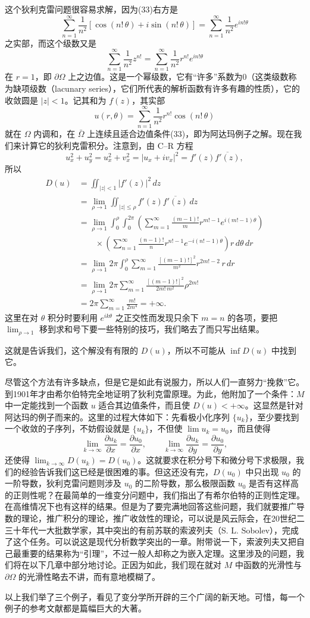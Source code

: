 这个狄利克雷问题很容易求解，因为(33)右方是
\[
 \sum_{n=1}^{\infty}\frac1{n^2}
 [\cos(n!\,\theta)+i\sin(n!\,\theta)]
 =\sum_{n=1}^{\infty}\frac1{n^2}e^{in!\theta}
\]
之实部，而这个级数又是
\[
 \sum_{n=1}^{\infty}\frac1{n^2}z^{n!}
 =\sum_{n=1}^{\infty}\frac1{n^2}r^{n!}e^{in!\theta}
\]
在 $r=1$，即 $\partial\Omega$ 上之边值。这是一个幂级数，它有“许多”系数为0（这类级数称为缺项级数（lacunary series），它们所代表的解析函数有许多有趣的性质），它的收敛圆是 $|z|<1$。记其和为 $f(z)$，其实部
\[
 u(r,\theta)=\sum_{n=1}^{\infty}\frac1{n^2}r^{n!}\cos(n!\,\theta)
\]
就在 $\Omega$ 内调和，在 $\bar\Omega$ 上连续且适合边值条件(33)，即为阿达玛例子之解。现在我们来计算它的狄利克雷积分。注意到，由 C--R 方程
\[
 u_x^2+u_y^2=u_x^2+v_x^2=|u_x+iv_x|^2=f'(z)\overline{f'(z)},
\]
所以
\begin{align*}
 D(u)
 &=\iint_{|z|<1}|f'(z)|^2\,dz\\
 &=\lim_{\rho\to1}\iint_{|z|\le\rho}f'(z)\overline{f'(z)}\,dz\\
 &=\lim_{\rho\to1}\int_0^\rho\int_0^{2\pi}
 \left(\sum_{m=1}^{\infty}\frac{(m-1)!}{m}r^{m!-1}e^{i(m!-1)\theta}\right)\\[-.25em]
 &\qquad\times
 \left(\sum_{n=1}^{\infty}\frac{(n-1)!}{n}r^{n!-1}e^{-i(n!-1)\theta}\right)
 r\,d\theta\,dr\\
 &=\lim_{\rho\to1}2\pi\int_0^\rho
 \sum_{m=1}^{\infty}\frac{[(m-1)!]^2}{m^2}r^{2m!-2}\,r\,dr\\
 &=\lim_{\rho\to1}2\pi\sum_{m=1}^{\infty}
 \frac{[(m-1)!]^2}{2m!\,m^2}\rho^{2m!}\\
 &=2\pi\sum_{m=1}^{\infty}\frac{m!}{2m^4}=+\infty.
\end{align*}
这里在对 $\theta$ 积分时要利用 $e^{ik\theta}$ 之正交性而发现只余下 $m=n$ 的各项，要把 $\lim_{\rho\to1}$ 移到求和号下要一些特别的技巧，我们略去了而只写出结果。

这就是告诉我们，这个解没有有限的 $D(u)$，所以不可能从 $\inf D(u)$ 中找到它。

尽管这个方法有许多缺点，但是它是如此有说服力，所以人们一直努力“挽救”它。到1901年才由希尔伯特完全地证明了狄利克雷原理。为此，他附加了一个条件：$M$ 中一定能找到一个函数 $u$ 适合其边值条件，而且使 $D(u)<+\infty$。这显然是针对阿达玛的例子而来的。这里的过程大体如下：先看极小化序列 $\{u_k\}$，至少要找到一个收敛的子序列，不妨假设就是 $\{u_k\}$，不但使 $\lim u_k=u_0$，而且使得
\[
 \lim_{k\to\infty}\frac{\partial u_k}{\partial x}=\frac{\partial u_0}{\partial x},
 \qquad
 \lim_{k\to\infty}\frac{\partial u_k}{\partial y}=\frac{\partial u_0}{\partial y},
\]
还使得 $\lim_{k\to\infty}D(u_k)=D(u_0)$。这就要求在积分号下和微分号下求极限，我们的经验告诉我们这已经是很困难的事。但这还没有完，$D(u_0)$ 中只出现 $u_0$ 的一阶导数，狄利克雷问题则涉及 $u_0$ 的二阶导数，那么极限函数 $u_0$ 是否有这样高的正则性呢？在最简单的一维变分问题中，我们指出了有希尔伯特的正则性定理。在高维情况下也有这样的结果。但是为了要完满地回答这些问题，我们就要推广导数的理论，推广积分的理论，推广收敛性的理论，可以说是风云际会，在20世纪二三十年代一大批数学家，其中突出的有前苏联的索波列夫（S. L. Sobolev），完成了这个任务。可以说这是现代分析数学突出的一章。附带说一下，索波列夫又把自己最重要的结果称为“引理”，不过一般人却称之为嵌入定理。这里涉及的问题，我们将在以下几章中部分地讨论。正因为如此，我们现在就对 $M$ 中函数的光滑性与 $\partial\Omega$ 的光滑性略去不讲，而有意地模糊了。

以上我们举了三个例子，看见了变分学所开辟的三个广阔的新天地。可惜，每一个例子的参考文献都是篇幅巨大的大著。
